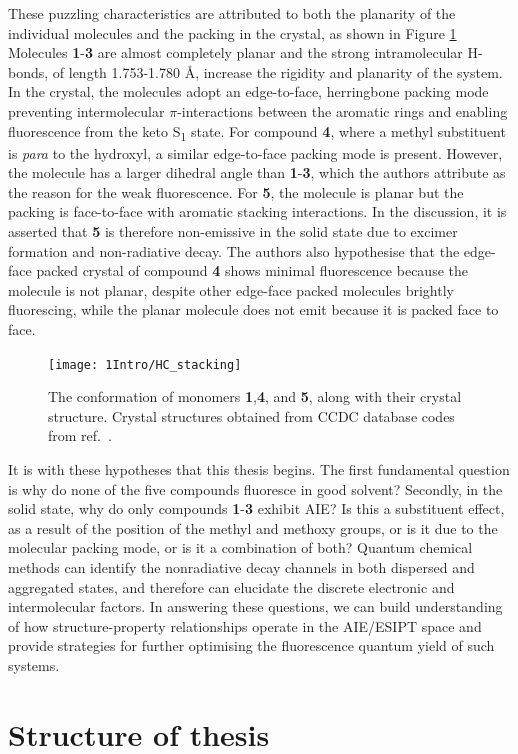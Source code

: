 These puzzling characteristics are attributed to both the planarity of the individual molecules and the packing in the crystal, as shown in Figure \ref{figure: HC_stacking}   Molecules \textbf{1}-\textbf{3} are almost completely planar and the strong intramolecular H-bonds, of length 1.753-1.780 \si{\angstrom}, increase the rigidity and planarity of the system. In the crystal, the molecules adopt an edge-to-face, herringbone packing mode preventing intermolecular $\pi$-interactions between the aromatic rings and enabling fluorescence from the keto S\textsubscript{1} state. For compound \textbf{4}, where a methyl substituent is \textit{para} to the hydroxyl, a similar edge-to-face packing mode is present. However, the molecule has a larger dihedral angle than \textbf{1}-\textbf{3}, which the authors attribute as the reason for the weak fluorescence. For \textbf{5}, the molecule is planar but the packing is face-to-face with aromatic stacking interactions. In the discussion, it is asserted that \textbf{5} is therefore non-emissive in the solid state due to excimer formation and non-radiative decay. The authors also hypothesise that the edge-face packed crystal of compound \textbf{4} shows minimal fluorescence because the molecule is not planar, despite other edge-face packed molecules brightly fluorescing, while the planar molecule does not emit because it is packed face to face.
\begin{figure}[H]
\centering
  \texttt{[image: 1Intro/HC\_stacking]}
  \caption[Crystal structures of 2'-hydroxychalcone derivatives]{The conformation of monomers \textbf{1},\textbf{4}, and \textbf{5}, along with their crystal structure. Crystal structures obtained from CCDC database codes from ref.~.}
  \label{figure: HC_stacking}
\end{figure}
It is with these hypotheses that this thesis begins. The first fundamental question is why do none of the five compounds fluoresce in good solvent? Secondly, in the solid state, why do only compounds \textbf{1}-\textbf{3} exhibit \ac{AIE}? Is this a substituent effect, as a result of the position of the methyl and methoxy groups, or is it due to the molecular packing mode, or is it a combination of both? Quantum chemical methods can identify the nonradiative decay channels in both dispersed and aggregated states, and therefore can elucidate the discrete electronic and intermolecular factors. In answering these questions, we can build understanding of how structure-property relationships operate in the \ac{AIE}/\ac{ESIPT} space and provide strategies for further optimising the fluorescence quantum yield of such systems.
\section{Structure of thesis}\label{section: lom outline}



